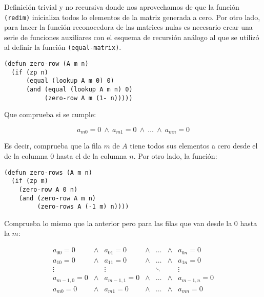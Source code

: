 \documentclass[a4paper,10pt]{article}
\begin{document}
\par \vspace{10pt}		

Definición trivial y no recursiva donde nos aprovechamos de que la función \texttt{(redim)} inicializa todos lo elementos de la matriz generada a cero. Por otro lado, para hacer la función reconocedora de las matrices nulas es necesario crear una serie de funciones auxiliares con el esquema de recursión análogo al que se utilizó al definir la función \texttt{(equal-matrix)}.

\par \vspace{10pt}		

\begin{lstlisting}[language=clips]
(defun zero-row (A m n)
  (if (zp n)
      (equal (lookup A m 0) 0)
      (and (equal (lookup A m n) 0)
           (zero-row A m (1- n)))))
\end{lstlisting}

\par \vspace{10pt}		

Que comprueba si se cumple:

\par \vspace{10pt}		

$$a_{m0} = 0\ \wedge\ a_{m1} = 0\ \wedge\ \dots\ \wedge\ a_{mn} = 0$$

\par \vspace{10pt}		

Es decir, comprueba que la fila $m$ de $A$ tiene todos sus elementos a cero desde el de la columna 0 hasta el de la columna $n$. Por otro lado, la función:

\par \vspace{10pt}		

\begin{lstlisting}[language=clips]
(defun zero-rows (A m n)
  (if (zp m)
    (zero-row A 0 n)
    (and (zero-row A m n)
         (zero-rows A (-1 m) n))))
\end{lstlisting}

\par \vspace{10pt}		

Comprueba lo mismo que la anterior pero para las filas que van desde la 0 hasta la $m$:

$$
\begin{array}{ccccccccc}
a_{00} = 0 & \wedge & a_{01} = 0 & \wedge & \dots & \wedge & a_{0n} = 0 \\
a_{10} = 0 & \wedge & a_{11} = 0 & \wedge & \dots & \wedge & a_{1n} = 0 \\
\vdots & & \vdots & & \ddots & & \vdots\\
a_{m-1,0} = 0 & \wedge & a_{m-1,1} = 0 & \wedge & \dots & \wedge & a_{m-1,n} = 0 \\
a_{m0} = 0 & \wedge & a_{m1} = 0 & \wedge & \dots & \wedge & a_{mn} = 0 \\
\end{array}
$$
\end{document}
